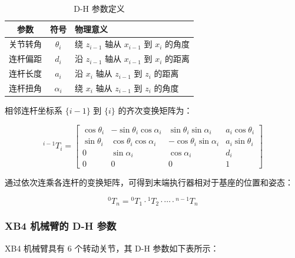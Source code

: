 \documentclass[12pt,a4paper,oneside]{article}
\numberwithin{equation}{section}
\begin{document}
\begin{table}[H]
    \centering
    \caption{D-H 参数定义}
    \begin{tabular}{ccp{7cm}}
        \toprule
        \textbf{参数} & \textbf{符号} & \textbf{物理意义} \\
        \midrule
        关节转角 & $\theta_i$ & 绕 $z_{i-1}$ 轴从 $x_{i-1}$ 到 $x_i$ 的角度 \\
        连杆偏距 & $d_i$ & 沿 $z_{i-1}$ 轴从 $x_{i-1}$ 到 $x_i$ 的距离 \\
        连杆长度 & $a_i$ & 沿 $x_i$ 轴从 $z_{i-1}$ 到 $z_i$ 的距离 \\
        连杆扭角 & $\alpha_i$ & 绕 $x_i$ 轴从 $z_{i-1}$ 到 $z_i$ 的角度 \\
        \bottomrule
    \end{tabular}
\end{table}

相邻连杆坐标系 $\{i-1\}$ 到 $\{i\}$ 的齐次变换矩阵为：

\begin{equation}
    {}^{i-1}T_i = \begin{bmatrix}
        \cos\theta_i & -\sin\theta_i\cos\alpha_i &  \sin\theta_i\sin\alpha_i & a_i\cos\theta_i \\
        \sin\theta_i &  \cos\theta_i\cos\alpha_i & -\cos\theta_i\sin\alpha_i & a_i\sin\theta_i \\
        0            &  \sin\alpha_i              &  \cos\alpha_i              & d_i             \\
        0            &  0                         &  0                         & 1
    \end{bmatrix}
    \label{eq:dh_transform}
\end{equation}

通过依次连乘各连杆的变换矩阵，可得到末端执行器相对于基座的位置和姿态：

\begin{equation}
    {}^{0}T_n = {}^{0}T_1 \cdot {}^{1}T_2 \cdot \cdots \cdot {}^{n-1}T_n
    \label{eq:forward_kinematics}
\end{equation}

\subsubsection{XB4 机械臂的 D-H 参数}

XB4 机械臂具有 6 个转动关节，其 D-H 参数如下表所示：
\end{document}
